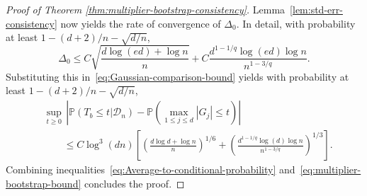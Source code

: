 \documentclass[11pt]{article}
\begin{document}
\begin{appendices}
\begin{proof}[Proof of Theorem \ref{thm:multiplier-bootstrap-consistency}]
 Lemma~\ref{lem:std-err-consistency} now yields the rate of convergence of $\Delta_0$. In detail,  with probability at least $1 - (d+2)/n - \sqrt{d/n}$,
\begin{equation}\label{eq:multiplier-bootstrap-bound-1}
\Delta_0 \le C\sqrt{\frac{d\log(ed) + \log n}{n}} + C\frac{d^{1-1/q}\log(ed)\log n}{n^{1-3/q}}.
\end{equation}
Substituting this in~\eqref{eq:Gaussian-comparison-bound} yields with probability at least $1 - (d + 2)/n - \sqrt{d/n}$,
\begin{equation}\label{eq:multiplier-bootstrap-bound}
\begin{split}
&\sup_{t\ge 0}\,\left|\mathbb{P}(T_b \le t\big|\mathcal{D}_n) - \mathbb{P}\left(\max_{1\le j\le d}|G_j| \le t\right)\right|\\ 
&\qquad\le C\log^3(dn)\left[\left(\frac{d\log d + \log n}{n}\right)^{1/6} + \left(\frac{d^{1-1/q}\log(d)\log n}{n^{1-3/q}}\right)^{1/3}\right].
\end{split}
\end{equation}
Combining inequalities~\eqref{eq:Average-to-conditional-probability} and~\eqref{eq:multiplier-bootstrap-bound} concludes the proof.
\end{proof}





\end{appendices}
\end{document}
